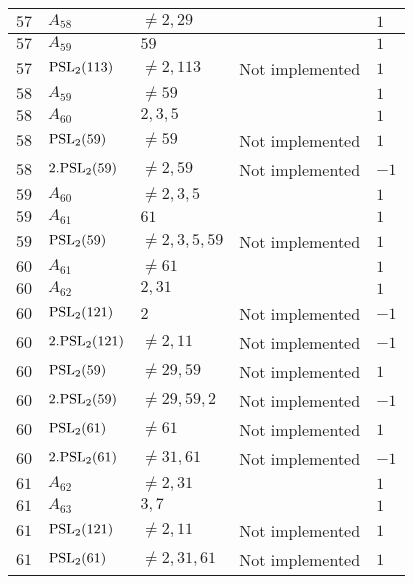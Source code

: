 \documentclass[a4paper, 11pt]{article}
\begin{document}
\begin{longtable}{lllll}
        $ 57 $ & $ A_{58} $ & $ \neq 2, 29 $ & $ ~ $ & $ 1  $ \\ \hline
        $ 57 $ & $ A_{59} $ & $ 59 $ & $ ~ $ & $ 1  $ \\ \hline
        $ 57 $ & $ {\rm PSL}_{2}(113) $ & $ \neq 2, 113 $ & Not implemented & $ 1  $ \\ \hline
        $ 58 $ & $ A_{59} $ & $ \neq 59 $ & $ ~ $ & $ 1  $ \\ \hline
        $ 58 $ & $ A_{60} $ & $ 2, 3, 5 $ & $ ~ $ & $ 1  $ \\ \hline
        $ 58 $ & $ {\rm PSL}_{2}(59) $ & $ \neq 59 $ & Not implemented & $ 1  $ \\ \hline
        $ 58 $ & $ 2.{\rm PSL}_{2}(59) $ & $ \neq 2, 59 $ & Not implemented & $ -1  $ \\ \hline
        $ 59 $ & $ A_{60} $ & $ \neq 2, 3, 5 $ & $ ~ $ & $ 1  $ \\ \hline
        $ 59 $ & $ A_{61} $ & $ 61 $ & $ ~ $ & $ 1  $ \\ \hline
        $ 59 $ & $ {\rm PSL}_{2}(59) $ & $ \neq 2, 3, 5, 59 $ & Not implemented & $ 1  $ \\ \hline
        $ 60 $ & $ A_{61} $ & $ \neq 61 $ & $ ~ $ & $ 1  $ \\ \hline
        $ 60 $ & $ A_{62} $ & $ 2, 31 $ & $ ~ $ & $ 1  $ \\ \hline
        $ 60 $ & $ {\rm PSL}_{2}(121) $ & $ 2 $ & Not implemented & $ -1  $ \\ \hline
        $ 60 $ & $ 2.{\rm PSL}_{2}(121) $ & $ \neq 2, 11 $ & Not implemented & $ -1  $ \\ \hline
        $ 60 $ & $ {\rm PSL}_{2}(59) $ & $ \neq 29, 59 $ & Not implemented & $ 1  $ \\ \hline
        $ 60 $ & $ 2.{\rm PSL}_{2}(59) $ & $ \neq 29, 59, 2 $ & Not implemented & $ -1  $ \\ \hline
        $ 60 $ & $ {\rm PSL}_{2}(61) $ & $ \neq 61 $ & Not implemented & $ 1  $ \\ \hline
        $ 60 $ & $ 2.{\rm PSL}_{2}(61) $ & $ \neq 31, 61 $ & Not implemented & $ -1  $ \\ \hline
        $ 61 $ & $ A_{62} $ & $ \neq 2, 31 $ & $ ~ $ & $ 1  $ \\ \hline
        $ 61 $ & $ A_{63} $ & $ 3, 7 $ & $ ~ $ & $ 1  $ \\ \hline
        $ 61 $ & $ {\rm PSL}_{2}(121) $ & $ \neq 2, 11 $ & Not implemented & $ 1  $ \\ \hline
        $ 61 $ & $ {\rm PSL}_{2}(61) $ & $ \neq 2, 31, 61 $ & Not implemented & $ 1  $ \\ \hline

\end{longtable}
\end{document}
